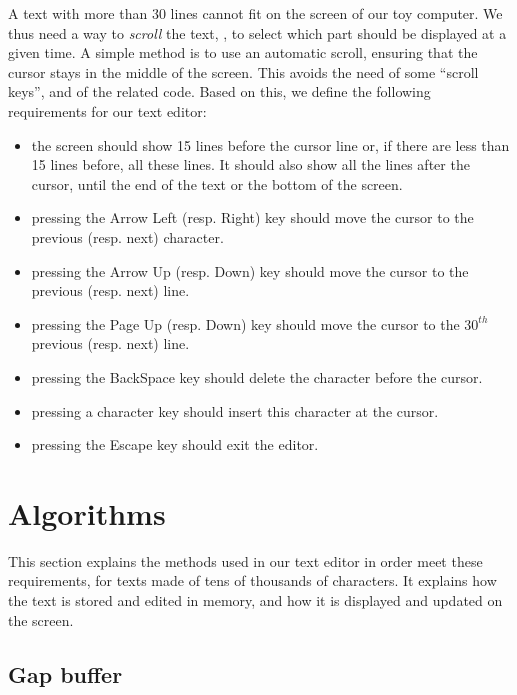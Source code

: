 A text with more than 30 lines cannot fit on the screen of our toy computer. We
thus need a way to {\em scroll} the text, \ie, to select which part should be
displayed at a given time. A simple method is to use an automatic scroll,
ensuring that the cursor stays in the middle of the screen. This avoids the
need of some ``scroll keys'', and of the related code. Based on this, we define
the following requirements for our text editor:
\begin{itemize}
\item the screen should show 15 lines before the cursor line or, if there are
less than 15 lines before, all these lines. It should also show all the lines
after the cursor, until the end of the text or the bottom of the screen.

\item pressing the Arrow Left (resp. Right) key should move the cursor to the
previous (resp. next) character.

\item pressing the Arrow Up (resp. Down) key should move the cursor to the
previous (resp. next) line.

\item pressing the Page Up (resp. Down) key should move the cursor to the
$30^{th}$ previous (resp. next) line.

\item pressing the BackSpace key should delete the character before the cursor.

\item pressing a character key should insert this character at the cursor.

\item pressing the Escape key should exit the editor.
\end{itemize}

\section{Algorithms}

This section explains the methods used in our text editor in order meet these
requirements, for texts made of tens of thousands of characters. It explains
how the text is stored and edited in memory, and how it is displayed and
updated on the screen.

\subsection{Gap buffer}

